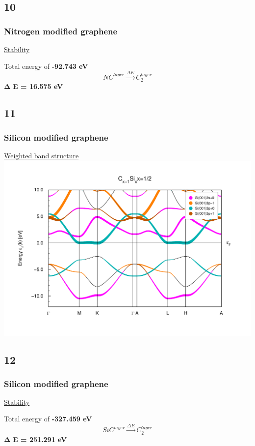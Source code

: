 \documentclass{beamer}
\begin{document}
	\subsection*{10}
		\begin{frame}
			\frametitle{Nitrogen modified graphene}
			\underline{Stability}
			\begin{center}
				Total energy of \textbf{-92.743 eV} \\
				\begin{equation}
					NC^{layer} \xrightarrow{\Delta E} C_2^{layer}
				\end{equation}
				$\boldsymbol{\Delta}$ \textbf{E = 16.575 eV}
			\end{center}
		\end{frame}
		
	\subsection*{11}
		\begin{frame}
			\frametitle{Silicon modified graphene}
			\underline{Weighted band structure}
			\includegraphics[width=\textwidth]{figures/Silicon1R/bweights.pdf}
		\end{frame}
		
	\subsection*{12}
		\begin{frame}
			\frametitle{Silicon modified graphene}
			\underline{Stability}
			\begin{center}
				Total energy of \textbf{-327.459 eV} \\
				\begin{equation}
					SiC^{layer} \xrightarrow{\Delta E} C_2^{layer}
				\end{equation}
				$\boldsymbol{\Delta}$ \textbf{E = 251.291 eV}
			\end{center}
		\end{frame}
\end{document}
